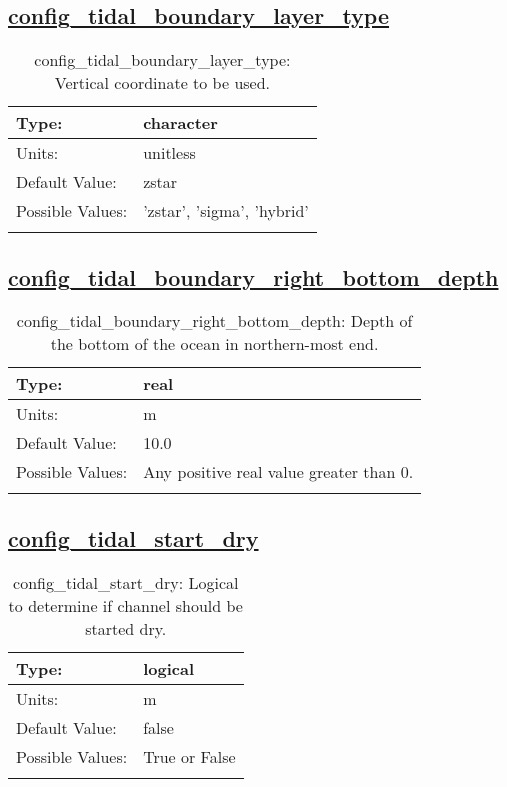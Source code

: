 \subsection[config\_tidal\_boundary\_layer\_type]{\hyperref[sec:nm_tab_tidal_boundary]{config\_tidal\_boundary\_layer\_type}}
\label{subsec:nm_sec_config_tidal_boundary_layer_type}
\begin{center}
\begin{longtable}{| p{2.0in} || p{4.0in} |}
    \hline
    Type: & character \\
    \hline
    Units: & \si{unitless} \\
    \hline
    Default Value: & zstar \\
    \hline
    Possible Values: & 'zstar', 'sigma', 'hybrid' \\
    \hline
    \caption{config\_tidal\_boundary\_layer\_type: Vertical coordinate to be used.}
\end{longtable}
\end{center}
\subsection[config\_tidal\_boundary\_right\_bottom\_depth]{\hyperref[sec:nm_tab_tidal_boundary]{config\_tidal\_boundary\_right\_bottom\_depth}}
\label{subsec:nm_sec_config_tidal_boundary_right_bottom_depth}
\begin{center}
\begin{longtable}{| p{2.0in} || p{4.0in} |}
    \hline
    Type: & real \\
    \hline
    Units: & \si{m} \\
    \hline
    Default Value: & 10.0 \\
    \hline
    Possible Values: & Any positive real value greater than 0. \\
    \hline
    \caption{config\_tidal\_boundary\_right\_bottom\_depth: Depth of the bottom of the ocean in northern-most end.}
\end{longtable}
\end{center}
\subsection[config\_tidal\_start\_dry]{\hyperref[sec:nm_tab_tidal_boundary]{config\_tidal\_start\_dry}}
\label{subsec:nm_sec_config_tidal_start_dry}
\begin{center}
\begin{longtable}{| p{2.0in} || p{4.0in} |}
    \hline
    Type: & logical \\
    \hline
    Units: & \si{m} \\
    \hline
    Default Value: & false \\
    \hline
    Possible Values: & True or False \\
    \hline
    \caption{config\_tidal\_start\_dry: Logical to determine if channel should be started dry.}
\end{longtable}
\end{center}
